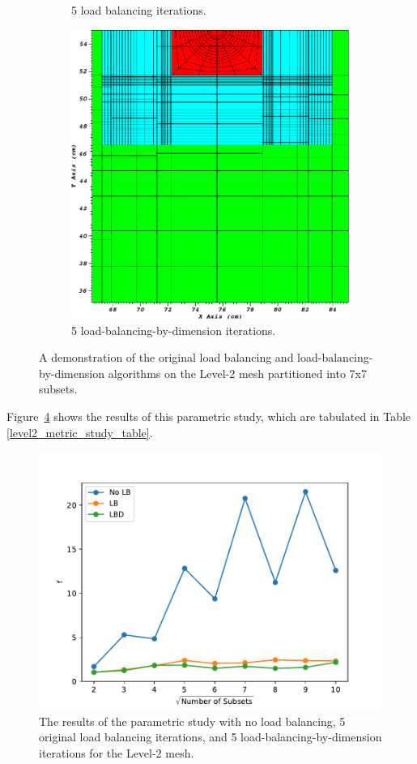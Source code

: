 \documentclass[times,final]{elsarticle}
\begin{document}
\begin{figure}[ht]
\begin{subfigure}[b]{\textwidth}
\caption{5 load balancing iterations.}
\label{7_lb}
\end{subfigure}
\begin{subfigure}[b]{\textwidth}
\centering
\includegraphics[scale=0.3]{../figures/level2_7_lbd_zoom.png}
\caption{5 load-balancing-by-dimension iterations.}
\label{7_lbd}
\end{subfigure}
\caption{A demonstration of the original load balancing and load-balancing-by-dimension algorithms on the Level-2 mesh partitioned into 7x7 subsets.}
\label{level2_alg_illustration}
\end{figure}
Figure~\ref{level2_metric_study} shows the results of this parametric study, which are tabulated in Table \ref{level2_metric_study_table}.
\begin{figure}[H]
\centering
\includegraphics[scale=0.7]{../figures/level2_metric_study.pdf}
\caption{The results of the parametric study with no load balancing, 5 original load balancing iterations, and 5 load-balancing-by-dimension iterations for the Level-2 mesh.}
\label{level2_metric_study}
\end{figure}
\end{document}
